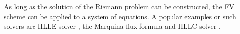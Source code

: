 %
%
As long as the solution of the Riemann problem can be constructed, the \ac{FV} scheme can be applied to a system of equations. 
A popular examples or such solvers are \ac{HLLE} solver \citep{Roe:1981}, the Marquina flux-formula \citep{Donat:1996} and \ac{HLLC} solver \citep{Einfeldt:1988}.

